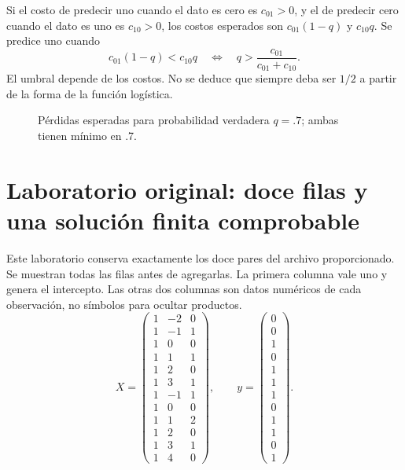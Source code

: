 \documentclass[11pt,a4paper]{article}
\begin{document}
Si el costo de predecir uno cuando el dato es cero
es \(c_{01}>0\), y el de predecir cero cuando el dato
es uno es \(c_{10}>0\), los costos esperados son
\(c_{01}(1-q)\) y \(c_{10}q\).
Se predice uno cuando
\[
c_{01}(1-q)<c_{10}q
\quad\Longleftrightarrow\quad
q>\frac{c_{01}}{c_{01}+c_{10}}.
\]
El umbral depende de los costos.
No se deduce que siempre deba ser \(1/2\) a partir
de la forma de la función logística.

\begin{figure}[H]\centering
{}
\caption{Pérdidas esperadas para probabilidad verdadera \(q=.7\); ambas tienen mínimo en .7.}
\end{figure}

\clearpage
\section{Laboratorio original: doce filas y una solución finita comprobable}\label{logit82}
Este laboratorio conserva exactamente los doce pares del archivo
proporcionado. Se muestran todas las filas antes de agregarlas.
La primera columna vale uno y genera el intercepto.
Las otras dos columnas son datos numéricos de cada observación,
no símbolos para ocultar productos.
\[
X=\begin{pmatrix}1&-2&0\\1&-1&1\\1&0&0\\1&1&1\\1&2&0\\1&3&1\\1&-1&1\\1&0&0\\1&1&2\\1&2&0\\1&3&1\\1&4&0\end{pmatrix},\qquad y=\begin{pmatrix}0\\0\\1\\0\\1\\1\\1\\0\\1\\1\\0\\1\end{pmatrix}.
\]
\end{document}
